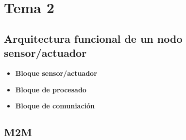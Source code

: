 \documentclass[12pt, letterpaper]{article}
\title{\doctitle}
\author{Juan Luis Serradilla Tormos}
\date{\monthname[\month] de \the\year}
\begin{document}
\pagestyle{fancy}

\maketitle

\newpage
\tableofcontents

\newpage

\section{Tema 2}

\subsection{Arquitectura funcional de un nodo sensor/actuador}

\begin{itemize}
    \item \textbf{Bloque sensor/actuador}
    \item \textbf{Bloque de procesado}
    \item \textbf{Bloque de comuniación}
\end{itemize}

\subsection{M2M}
\end{document}
